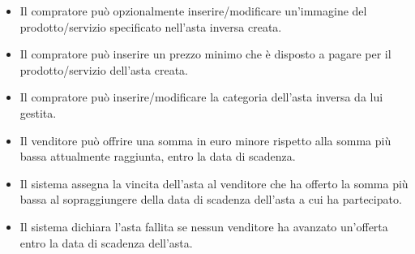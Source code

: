 \begin{itemize}
\begin{itemize}
                    \item Il compratore può opzionalmente inserire/modificare un'immagine del prodotto/servizio specificato nell'asta inversa creata.
                    \item Il compratore può inserire un prezzo minimo che è disposto a pagare per il prodotto/servizio dell'asta creata.
                    \item Il compratore può inserire/modificare la categoria dell'asta inversa da lui gestita.
                    \item Il venditore può offrire una somma in euro minore rispetto alla somma più bassa attualmente raggiunta, entro la data di scadenza.
                    \item Il sistema assegna la vincita dell'asta al venditore che ha offerto la somma più bassa al sopraggiungere della data di scadenza dell'asta a cui ha partecipato.
                    \item Il sistema dichiara l'asta fallita se nessun venditore ha avanzato un'offerta entro la data di scadenza dell'asta.
                \end{itemize}
        \end{itemize}